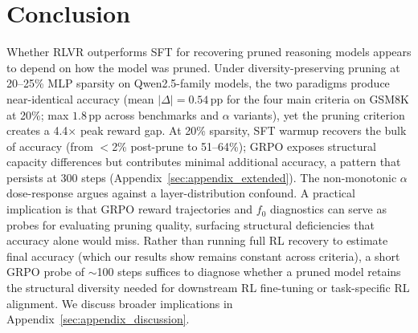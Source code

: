 \section{Conclusion}
\label{sec:conclusion}

Whether RLVR outperforms SFT for recovering pruned reasoning models appears to depend on how the model was pruned.
Under diversity-preserving pruning at 20--25\% MLP sparsity on Qwen2.5-family models, the two paradigms produce near-identical accuracy (mean $|\Delta| {=} 0.54$\,pp for the four main criteria on GSM8K at 20\%; max $1.8$\,pp across benchmarks and $\alpha$ variants), yet the pruning criterion creates a 4.4$\times$ peak reward gap.
At 20\% sparsity, SFT warmup recovers the bulk of accuracy (from $<$2\% post-prune to 51--64\%); GRPO exposes structural capacity differences but contributes minimal additional accuracy, a pattern that persists at 300 steps (Appendix~\ref{sec:appendix_extended}).
The non-monotonic $\alpha$ dose-response argues against a layer-distribution confound.
A practical implication is that GRPO reward trajectories and $f_0$ diagnostics can serve as probes for evaluating pruning quality, surfacing structural deficiencies that accuracy alone would miss.
Rather than running full RL recovery to estimate final accuracy (which our results show remains constant across criteria), a short GRPO probe of ${\sim}$100 steps suffices to diagnose whether a pruned model retains the structural diversity needed for downstream RL fine-tuning or task-specific RL alignment.
We discuss broader implications in Appendix~\ref{sec:appendix_discussion}.
